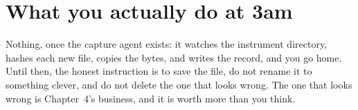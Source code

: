 \section{What you actually do at 3am}

Nothing, once the capture agent exists: it watches the instrument directory, hashes each new file, copies the bytes, and writes the record, and you go home. Until then, the honest instruction is to save the file, do not rename it to something clever, and do not delete the one that looks wrong. The one that looks wrong is Chapter~4's business, and it is worth more than you think.
